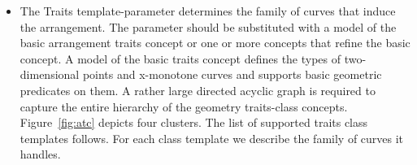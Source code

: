 \begin{itemize}
  \item The Traits template-parameter determines the family of curves that induce the arrangement. The parameter should be substituted with a model of the basic arrangement traits concept or one or more concepts that refine the basic concept. A model of the basic traits concept defines the types of two-dimensional points and x-monotone curves and supports basic geometric predicates on them. A rather large directed acyclic graph is required to capture the entire hierarchy of the geometry traits-class concepts. Figure~\ref{fig:atc} depicts four clusters. The list of supported traits class templates follows. For each class template we describe the family of curves it handles.


\end{itemize}
